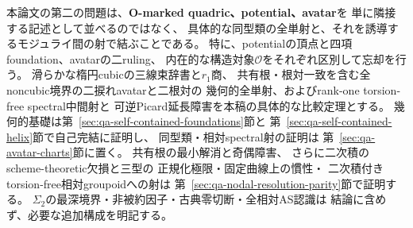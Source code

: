 \documentclass[a4paper,11pt]{ltjsarticle}
\numberwithin{equation}{section}
\theoremstyle{plain}
\theoremstyle{definition}
\theoremstyle{remark}
\newcommand{\OO}{\mathcal O}
\begin{document}
本論文の第二の問題は、\textbf{O-marked quadric、potential、avatar}を
単に隣接する記述として並べるのではなく、
具体的な同型類の全単射と、それを誘導するモジュライ間の射で結ぶことである。
特に、potentialの頂点と四項foundation、avatarの二ruling、
内在的な構造対象$\OO$をそれぞれ区別して忘却を行う。
滑らかな楕円cubicの三線束辞書と$r_1$商、
共有根・根対一致を含む全noncubic境界の二捩れavatarと二根対の
幾何的全単射、およびrank-one torsion-free spectral中間射と
可逆Picard延長障害を本稿の具体的な比較定理とする。
幾何的基礎は第~\ref{sec:qa-self-contained-foundations}節と
第~\ref{sec:qa-self-contained-helix}節で自己完結に証明し、
同型類・相対spectral射の証明は
第~\ref{sec:qa-avatar-charts}節に置く。
共有根の最小解消と奇偶障害、
さらに二次積のscheme-theoretic欠損と三型の
正規化極限・固定曲線上の慣性・
二次積付きtorsion-free相対groupoidへの射は
第~\ref{sec:qa-nodal-resolution-parity}節で証明する。
$\Sigma_2$の最深境界・非被約因子・古典零切断・全相対AS認識は
結論に含めず、必要な追加構成を明記する。
\end{document}
